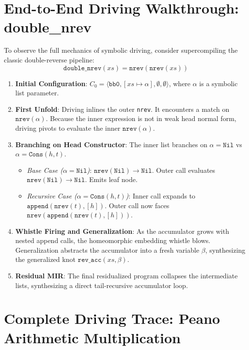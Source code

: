 \section{End-to-End Driving Walkthrough: double\_nrev}
\label{sec:driving:nrev_walkthrough}

To observe the full mechanics of symbolic driving, consider supercompiling the classic double-reverse pipeline:
\begin{equation}
\mathtt{double\_nrev}(xs) = \mathtt{nrev}(\mathtt{nrev}(xs))
\end{equation}

\begin{enumerate}
    \item \textbf{Initial Configuration}: $C_0 = \langle \mathtt{bb0}, [xs \mapsto \alpha], \emptyset, \emptyset \rangle$, where $\alpha$ is a symbolic list parameter.
    \item \textbf{First Unfold}: Driving inlines the outer \texttt{nrev}. It encounters a match on $\mathtt{nrev}(\alpha)$. Because the inner expression is not in weak head normal form, driving pivots to evaluate the inner $\mathtt{nrev}(\alpha)$.
    \item \textbf{Branching on Head Constructor}: The inner list branches on $\alpha = \mathtt{Nil}$ vs $\alpha = \mathtt{Cons}(h, t)$.
    \begin{itemize}
        \item \emph{Base Case ($\alpha = \mathtt{Nil}$)}: $\mathtt{nrev}(\mathtt{Nil}) \to \mathtt{Nil}$. Outer call evaluates $\mathtt{nrev}(\mathtt{Nil}) \to \mathtt{Nil}$. Emits leaf node.
        \item \emph{Recursive Case ($\alpha = \mathtt{Cons}(h, t)$)}: Inner call expands to $\mathtt{append}(\mathtt{nrev}(t), [h])$. Outer call now faces $\mathtt{nrev}(\mathtt{append}(\mathtt{nrev}(t), [h]))$.
    \end{itemize}
    \item \textbf{Whistle Firing and Generalization}: As the accumulator grows with nested append calls, the homeomorphic embedding whistle blows. Generalization abstracts the accumulator into a fresh variable $\beta$, synthesizing the generalized knot $\mathtt{rev\_acc}(xs, \beta)$.
    \item \textbf{Residual MIR}: The final residualized program collapses the intermediate lists, synthesizing a direct tail-recursive accumulator loop.
\end{enumerate}

\section{Complete Driving Trace: Peano Arithmetic Multiplication}
\label{sec:driving:peano_trace}

